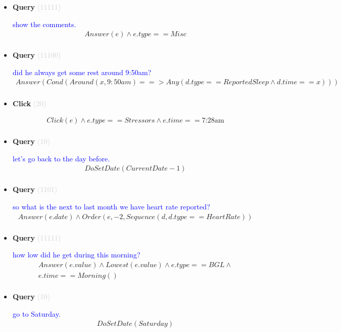 \documentclass[11pt]{article}
\newcommand{\key}[1]{\textcolor{lightgray}{#1}}
\newcounter{CQuery}
\newcounter{CClick}
\begin{document}
\begin{itemize}
\item
\textbf{Query\theCQuery} \key{(11111)} \addtocounter{CQuery}{1}
\textcolor{blue}{ show the comments. }
\begin{multline*}
Answer(e) \wedge e.type==Misc \\ 
\end{multline*}


\item
\textbf{Query\theCQuery} \key{(11100)} \addtocounter{CQuery}{1}
\textcolor{blue}{ did he always get some rest around 9:50am? }
\begin{multline*}
Answer(Cond(Around(x, 9:50am) ==> Any(d.type==ReportedSleep \wedge d.time==x))) \\ 
\end{multline*}


\item
\textbf{Click\theCClick} \key{(20)} \addtocounter{CClick}{1}
\textcolor{blue}{  }
\begin{multline*}
Click(e) \wedge e.type==Stressors \wedge e.time==\mbox{7:28am} \\ 
\end{multline*}


\item
\textbf{Query\theCQuery} \key{(10)} \addtocounter{CQuery}{1}
\textcolor{blue}{ let's go back to the day before. }
\begin{multline*}
DoSetDate(CurrentDate - 1) \\ 
\end{multline*}


\item
\textbf{Query\theCQuery} \key{(1101)} \addtocounter{CQuery}{1}
\textcolor{blue}{ so what is the next to last month we have heart rate reported? }
\begin{multline*}
Answer(e.date) \wedge Order(e, -2, Sequence(d, d.type==HeartRate)) \\ 
\end{multline*}


\item
\textbf{Query\theCQuery} \key{(11111)} \addtocounter{CQuery}{1}
\textcolor{blue}{ how low did he get during this morning? }
\begin{multline*}
Answer(e.value) \wedge Lowest(e.value) \wedge e.type==BGL \wedge \\ 
e.time==Morning() \\ 
\end{multline*}


\item
\textbf{Query\theCQuery} \key{(10)} \addtocounter{CQuery}{1}
\textcolor{blue}{ go to Saturday. }
\begin{multline*}
DoSetDate(Saturday) \\ 
\end{multline*}



\end{itemize}
\end{document}
